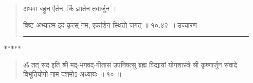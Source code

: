 \begin{quotation}

अथवा बहुन एैतेन, किं ज्ञातेन तवार्जुन  ।  

विष्ट-अभ्याहम इदं कृत्स्-नम, एकांशेन स्थितो जगत्‌  ॥ १०.४२ ॥  उच्चारण

\noindent\rule{16cm}{0.4pt} 
\end{quotation}

\begin{center} ***** \end{center}


\begin{quotation} 


ॐ तत् सद इति श्री मद्-भगवद्-गीतास उपनिषत्सु ब्रह्म विद्यायां योगशास्त्रे श्री कृष्णार्जुन संवादे विभूतियोगो नाम दशमोऽ अध्यायः  ॥  १०  ॥ 
\end{quotation} 